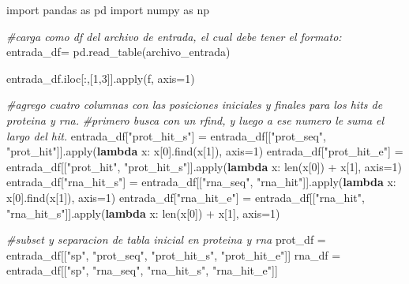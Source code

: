 \documentclass[11pt]{article}
\newenvironment{Shaded}{}{}
\newcommand{\KeywordTok}[1]{\textcolor[rgb]{0.00,0.44,0.13}{\textbf{{#1}}}}
\newcommand{\DecValTok}[1]{\textcolor[rgb]{0.25,0.63,0.44}{{#1}}}
\newcommand{\StringTok}[1]{\textcolor[rgb]{0.25,0.44,0.63}{{#1}}}
\newcommand{\CommentTok}[1]{\textcolor[rgb]{0.38,0.63,0.69}{\textit{{#1}}}}
\newcommand{\NormalTok}[1]{{#1}}
\newcommand{\ImportTok}[1]{{#1}}
\newcommand{\OperatorTok}[1]{\textcolor[rgb]{0.40,0.40,0.40}{{#1}}}
\newcommand{\BuiltInTok}[1]{{#1}}
\begin{document}
    \begin{Shaded}
\begin{Highlighting}[]

\ImportTok{import}\NormalTok{ pandas }\ImportTok{as}\NormalTok{ pd}
\ImportTok{import}\NormalTok{ numpy }\ImportTok{as}\NormalTok{ np}


\CommentTok{#carga como df del archivo de entrada, el cual debe tener el formato:}
\NormalTok{entrada_df}\OperatorTok{=}\NormalTok{ pd.read_table(archivo_entrada)}

\NormalTok{entrada_df.iloc[:,[}\DecValTok{1}\NormalTok{,}\DecValTok{3}\NormalTok{]].}\BuiltInTok{apply}\NormalTok{(f, axis}\OperatorTok{=}\DecValTok{1}\NormalTok{)}

\CommentTok{#agrego cuatro columnas con las posiciones iniciales y finales para los hits de proteina y rna.}
\CommentTok{#primero busca con un rfind, y luego a ese numero le suma el largo del hit.}
\NormalTok{entrada_df[}\StringTok{"prot_hit_s"}\NormalTok{] }\OperatorTok{=}\NormalTok{ entrada_df[[}\StringTok{"prot_seq"}\NormalTok{, }\StringTok{"prot_hit"}\NormalTok{]].}\BuiltInTok{apply}\NormalTok{(}\KeywordTok{lambda}\NormalTok{ x: x[}\DecValTok{0}\NormalTok{].find(x[}\DecValTok{1}\NormalTok{]), axis}\OperatorTok{=}\DecValTok{1}\NormalTok{)}
\NormalTok{entrada_df[}\StringTok{"prot_hit_e"}\NormalTok{] }\OperatorTok{=}\NormalTok{ entrada_df[[}\StringTok{"prot_hit"}\NormalTok{, }\StringTok{"prot_hit_s"}\NormalTok{]].}\BuiltInTok{apply}\NormalTok{(}\KeywordTok{lambda}\NormalTok{ x: }\BuiltInTok{len}\NormalTok{(x[}\DecValTok{0}\NormalTok{]) }\OperatorTok{+}\NormalTok{ x[}\DecValTok{1}\NormalTok{], axis}\OperatorTok{=}\DecValTok{1}\NormalTok{)}
\NormalTok{entrada_df[}\StringTok{"rna_hit_s"}\NormalTok{] }\OperatorTok{=}\NormalTok{ entrada_df[[}\StringTok{"rna_seq"}\NormalTok{, }\StringTok{"rna_hit"}\NormalTok{]].}\BuiltInTok{apply}\NormalTok{(}\KeywordTok{lambda}\NormalTok{ x: x[}\DecValTok{0}\NormalTok{].find(x[}\DecValTok{1}\NormalTok{]), axis}\OperatorTok{=}\DecValTok{1}\NormalTok{)}
\NormalTok{entrada_df[}\StringTok{"rna_hit_e"}\NormalTok{] }\OperatorTok{=}\NormalTok{ entrada_df[[}\StringTok{"rna_hit"}\NormalTok{, }\StringTok{"rna_hit_s"}\NormalTok{]].}\BuiltInTok{apply}\NormalTok{(}\KeywordTok{lambda}\NormalTok{ x: }\BuiltInTok{len}\NormalTok{(x[}\DecValTok{0}\NormalTok{]) }\OperatorTok{+}\NormalTok{ x[}\DecValTok{1}\NormalTok{], axis}\OperatorTok{=}\DecValTok{1}\NormalTok{)}


\CommentTok{#subset y separacion de tabla inicial en proteina y rna}
\NormalTok{prot_df }\OperatorTok{=}\NormalTok{ entrada_df[[}\StringTok{"sp"}\NormalTok{, }\StringTok{"prot_seq"}\NormalTok{, }\StringTok{"prot_hit_s"}\NormalTok{, }\StringTok{"prot_hit_e"}\NormalTok{]]}
\NormalTok{rna_df }\OperatorTok{=}\NormalTok{ entrada_df[[}\StringTok{"sp"}\NormalTok{, }\StringTok{"rna_seq"}\NormalTok{, }\StringTok{"rna_hit_s"}\NormalTok{, }\StringTok{"rna_hit_e"}\NormalTok{]]}




\end{Highlighting}
\end{Shaded}
\end{document}
